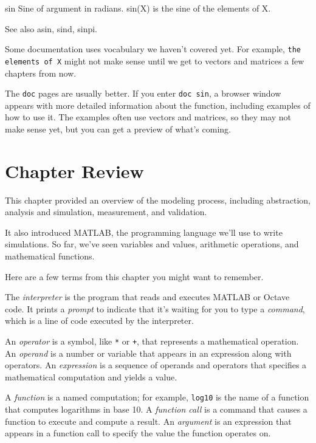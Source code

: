 \begin{stdout}
 sin    Sine of argument in radians.
    sin(X) is the sine of the elements of X.

    See also asin, sind, sinpi.
\end{stdout}

Some documentation uses vocabulary we haven't covered yet.
For example, \lstinline{the elements of X} might not make sense until
we get to vectors and matrices a few chapters from now.


The \lstinline{doc} pages are usually better.
If you enter \lstinline{doc sin}, a browser window appears with more detailed information about the function, including examples of how to use it.  The examples often
use vectors and matrices, so they may not make sense yet,
but you can get a preview of what's coming.


\section{Chapter Review}

This chapter provided an overview of the modeling process, including abstraction, analysis and simulation, measurement, and validation.

It also introduced MATLAB, the programming language we'll use to write simulations.  So far, we've seen variables and values, arithmetic operations, and mathematical functions.

Here are a few terms from this chapter you might want to remember.

The \emph{interpreter} is the program that reads and executes MATLAB or \mbox{Octave} code.
It prints a \emph{prompt} to indicate that it's waiting for you to type a \emph{command}, which is a line of code executed by the interpreter.

An \emph{operator} is a symbol, like \lstinline{*} or \lstinline{+}, that
represents a mathematical operation.
An \emph{operand} is a number or variable that appears in an expression along
with operators.
An \emph{expression} is a sequence of operands and operators that specifies
a mathematical computation and yields a value.

A \emph{function} is a named computation; for example, \lstinline{log10} is the
name of a function that computes logarithms in base 10.
A \emph{function call} is a command that causes a function to execute and compute a result.
An \emph{argument} is an expression that appears in a function call to
specify the value the function operates on.

